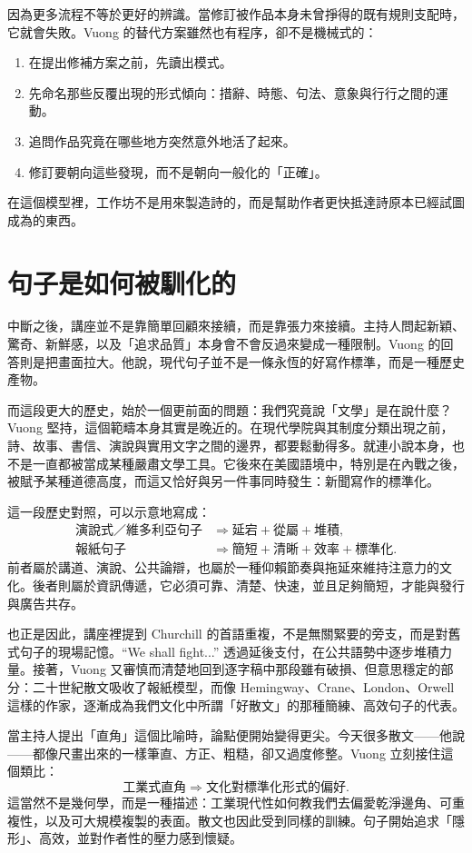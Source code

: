因為更多流程不等於更好的辨識。當修訂被作品本身未曾掙得的既有規則支配時，它就會失敗。Vuong 的替代方案雖然也有程序，卻不是機械式的：
\begin{enumerate}
\item 在提出修補方案之前，先讀出模式。
\item 先命名那些反覆出現的形式傾向：措辭、時態、句法、意象與行行之間的運動。
\item 追問作品究竟在哪些地方突然意外地活了起來。
\item 修訂要朝向這些發現，而不是朝向一般化的「正確」。
\end{enumerate}
在這個模型裡，工作坊不是用來製造詩的，而是幫助作者更快抵達詩原本已經試圖成為的東西。

\section{句子是如何被馴化的}

中斷之後，講座並不是靠簡單回顧來接續，而是靠張力來接續。主持人問起新穎、驚奇、新鮮感，以及「追求品質」本身會不會反過來變成一種限制。Vuong 的回答則是把畫面拉大。他說，現代句子並不是一條永恆的好寫作標準，而是一種歷史產物。

而這段更大的歷史，始於一個更前面的問題：我們究竟說「文學」是在說什麼？Vuong 堅持，這個範疇本身其實是晚近的。在現代學院與其制度分類出現之前，詩、故事、書信、演說與實用文字之間的邊界，都要鬆動得多。就連小說本身，也不是一直都被當成某種嚴肅文學工具。它後來在美國語境中，特別是在內戰之後，被賦予某種道德高度，而這又恰好與另一件事同時發生：新聞寫作的標準化。

這一段歷史對照，可以示意地寫成：
\begin{align}
\text{演說式／維多利亞句子} &\Longrightarrow \text{延宕} + \text{從屬} + \text{堆積},\\
\text{報紙句子} &\Longrightarrow \text{簡短} + \text{清晰} + \text{效率} + \text{標準化}.
\end{align}
前者屬於講道、演說、公共論辯，也屬於一種仰賴節奏與拖延來維持注意力的文化。後者則屬於資訊傳遞，它必須可靠、清楚、快速，並且足夠簡短，才能與發行與廣告共存。

也正是因此，講座裡提到 Churchill 的首語重複，不是無關緊要的旁支，而是對舊式句子的現場記憶。``We shall fight...'' 透過延後支付，在公共語勢中逐步堆積力量。接著，Vuong 又審慎而清楚地回到逐字稿中那段雖有破損、但意思穩定的部分：二十世紀散文吸收了報紙模型，而像 Hemingway、Crane、London、Orwell 這樣的作家，逐漸成為我們文化中所謂「好散文」的那種簡練、高效句子的代表。

當主持人提出「直角」這個比喻時，論點便開始變得更尖。今天很多散文——他說——都像尺畫出來的一樣筆直、方正、粗糙，卻又過度修整。Vuong 立刻接住這個類比：
\begin{equation}
\text{工業式直角} \Longrightarrow \text{文化對標準化形式的偏好}.
\end{equation}
這當然不是幾何學，而是一種描述：工業現代性如何教我們去偏愛乾淨邊角、可重複性，以及可大規模複製的表面。散文也因此受到同樣的訓練。句子開始追求「隱形」、高效，並對作者性的壓力感到懷疑。

